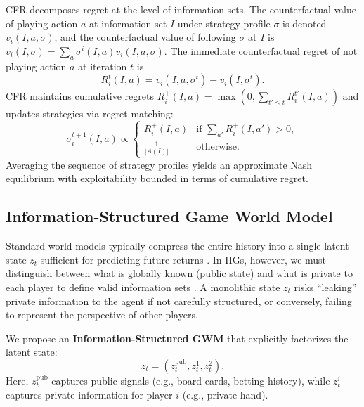 \documentclass{article}
\begin{document}
CFR decomposes regret at the level of information sets. The counterfactual value of playing action $a$ at information set $I$ under strategy profile $\sigma$ is denoted $v_i(I,a,\sigma)$, and the counterfactual value of following $\sigma$ at $I$ is $v_i(I,\sigma) = \sum_a \sigma^i(I,a) v_i(I,a,\sigma)$. The immediate counterfactual regret of not playing action $a$ at iteration $t$ is
\begin{equation}
R^t_i(I,a) = v_i(I,a,\sigma^t) - v_i(I,\sigma^t).
\end{equation}
CFR maintains cumulative regrets $R^+_i(I,a) = \max(0, \sum_{t' \le t} R^{t'}_i(I,a))$ and updates strategies via regret matching:
\begin{equation}
\sigma^{t+1}_i(I,a) \propto
\begin{cases}
R^+_i(I,a) & \text{if } \sum_{a'} R^+_i(I,a') > 0, \\
\frac{1}{|A(I)|} & \text{otherwise}.
\end{cases}
\end{equation}
Averaging the sequence of strategy profiles yields an approximate Nash equilibrium with exploitability bounded in terms of cumulative regret.

\subsection{Information-Structured Game World Model}
\label{sec:info_structured_gwm}

Standard world models typically compress the entire history into a single latent state $z_t$ sufficient for predicting future returns \cite{ha2018worldmodels,hafner2019dreamer}. In IIGs, however, we must distinguish between what is globally known (public state) and what is private to each player to define valid information sets \cite{osborne1994course}. A monolithic state $z_t$ risks ``leaking'' private information to the agent if not carefully structured, or conversely, failing to represent the perspective of other players.

We propose an \textbf{Information-Structured GWM} that explicitly factorizes the latent state:
\begin{equation}
    z_t = (z_t^\text{pub}, z_t^1, z_t^2).
\end{equation}
Here, $z_t^\text{pub}$ captures public signals (e.g., board cards, betting history), while $z_t^i$ captures private information for player $i$ (e.g., private hand).
\end{document}
